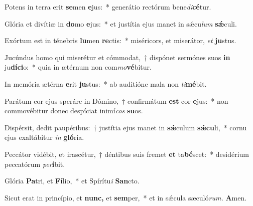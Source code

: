 \item Potens in terra erit \textbf{se}men \textbf{e}jus:~* generátio rectórum bene\tinyhspace\textit{di}\textbf{cé}tur.
\item Glória et divítiæ in \textbf{do}mo \textbf{e}jus:~* et justítia ejus manet in sǽcu\tinyhspace\textit{lum} \textbf{sǽ}culi.
\item Exórtum est in ténebris \textbf{lu}men \textbf{re}ctis:~* miséricors, et miserátor, \textit{et} \textbf{ju}stus.
\item Jucúndus homo qui miserétur et cómmodat,~† dispónet sermónes suos \textbf{in} ju\textbf{dí}\textbf{ci}o:~* quia in ætérnum non com\textit{mo}\textbf{vé}bitur.
\item In memória ætérna \textbf{e}rit \textbf{ju}stus:~* ab auditióne mala non \textit{ti}\textbf{mé}bit.
\item Parátum cor ejus speráre in Dómino,~† confirmátum \textbf{est} cor \textbf{e}jus:~* non commovébitur donec despíciat inimí\tinyhspace\textit{cos} \textbf{su}os.
\item Dispérsit, dedit paupéribus:~† justítia ejus manet in \textbf{sǽ}culum \textbf{sǽ}\textbf{cu}li,~* cornu ejus exaltábitur \textit{in} \textbf{gló}ria.
\item Peccátor vidébit, et irascétur,~† déntibus suis fremet \textbf{et} ta\textbf{bé}scet:~* desidérium peccatórum \textit{per}\textbf{í}bit.
\item Glória \textbf{Pa}tri, et \textbf{Fí}lio,~* et Spírítu\textit{i} \textbf{San}cto.
\item Sicut erat in princípio, et \textbf{nunc,} et \textbf{sem}per,~* et in sǽcula sæculó\textit{rum.} \textbf{A}men.